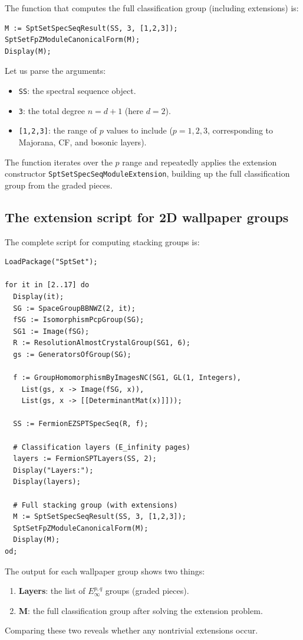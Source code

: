 \documentclass{SciPost}
\theoremstyle{definition}
\begin{document}
The function that computes the full classification group (including extensions) is:
\begin{verbatim}
M := SptSetSpecSeqResult(SS, 3, [1,2,3]);
SptSetFpZModuleCanonicalForm(M);
Display(M);
\end{verbatim}

Let us parse the arguments:
\begin{itemize}
    \item \texttt{SS}: the spectral sequence object.
    \item \texttt{3}: the total degree $n = d + 1$ (here $d = 2$).
    \item \texttt{[1,2,3]}: the range of $p$ values to include ($p = 1, 2, 3$, corresponding to Majorana, CF, and bosonic layers).
\end{itemize}

The function iterates over the $p$ range and repeatedly applies the extension constructor \texttt{SptSetSpecSeqModuleExtension}, building up the full classification group from the graded pieces.

\subsection{The extension script for 2D wallpaper groups}
\label{subsec:ext-script}

The complete script for computing stacking groups is:
\begin{verbatim}
LoadPackage("SptSet");

for it in [2..17] do
  Display(it);
  SG := SpaceGroupBBNWZ(2, it);
  fSG := IsomorphismPcpGroup(SG);
  SG1 := Image(fSG);
  R := ResolutionAlmostCrystalGroup(SG1, 6);
  gs := GeneratorsOfGroup(SG);

  f := GroupHomomorphismByImagesNC(SG1, GL(1, Integers),
    List(gs, x -> Image(fSG, x)),
    List(gs, x -> [[DeterminantMat(x)]]));

  SS := FermionEZSPTSpecSeq(R, f);

  # Classification layers (E_infinity pages)
  layers := FermionSPTLayers(SS, 2);
  Display("Layers:");
  Display(layers);

  # Full stacking group (with extensions)
  M := SptSetSpecSeqResult(SS, 3, [1,2,3]);
  SptSetFpZModuleCanonicalForm(M);
  Display(M);
od;
\end{verbatim}

The output for each wallpaper group shows two things:
\begin{enumerate}
    \item \textbf{Layers}: the list of $E_\infty^{p,q}$ groups (graded pieces).
    \item \textbf{M}: the full classification group after solving the extension problem.
\end{enumerate}
Comparing these two reveals whether any nontrivial extensions occur.
\end{document}
